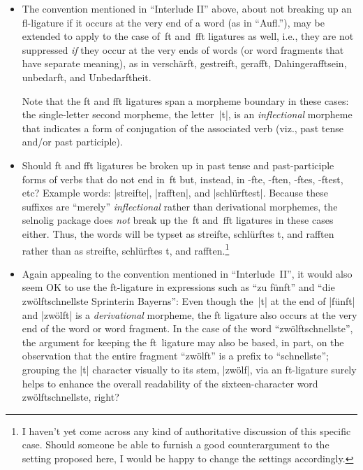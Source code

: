 \documentclass[11pt]{article}
\newcommand{\pkg}[1]{\textsf{#1}}
\begin{document}
\begin{itemize}
\begin{itemize}
\begin{itemize}
\item The convention mentioned in \enquote{Interlude II} above, about not breaking up an fl-ligature if it occurs at the very end of a word (as in ``Aufl.''), may be extended to apply to the case of~ft and~fft ligatures as well, i.e., they are not suppressed \emph{if} they occur at the very ends of words (or word fragments that have separate meaning), as in verschärft, gestreift, gerafft, Dahingerafftsein, unbedarft, and Unbedarftheit. 

Note that the ft and fft ligatures span a morpheme boundary in these cases: the single-letter second morpheme, the letter~|t|, is an \emph{inflectional} morpheme that indicates a form of conjugation of the associated verb (viz., past tense and/or past participle).

\item Should ft and fft ligatures be broken up in past tense and past-participle forms of verbs that do not end in~ft but, instead, in -fte, -ften, -ftes, -ftest, etc? Example words: |streifte|, |rafften|, and |schlürftest|. Because these suffixes are \enquote{merely} \emph{inflectional} rather than derivational morphemes, the \pkg{selnolig} package does \emph{not} break up the~ft and~fft ligatures in these cases either. Thus, the words will be typset as streifte, schlürftes\kern0pt t, and rafften rather than as streif\breaklig te, schlürf\breaklig tes\kern0pt t, and raff\breaklig ten.\footnote{I haven't yet come across any kind of authoritative discussion of this specific case. Should someone be able to furnish a good counterargument to the setting proposed here, I would be happy to change the settings accordingly.}

\enlargethispage{1.2\baselineskip}

\item Again appealing to the convention mentioned in \enquote{Interlude~II}, it would also seem OK to use the ft-ligature in expressions such as \enquote{zu fünft} and \enquote{die zwölftschnellste Sprinterin Bayerns}: Even though the~|t| at the end of |fünft| and |zwölft| is a \emph{derivational} morpheme, the ft ligature also occurs at the very end of the word or word fragment. In the case of the word \enquote{zwölftschnellste}, the argument for keeping the ft~ligature may also be based, in part, on the observation that the entire fragment \enquote{zwölft} is a prefix to \enquote{schnellste}; grouping the |t| character visually to its stem, |zwölf|, via an ft-ligature surely helps to enhance the overall readability of the sixteen-character word zwölftschnellste, right?


\end{itemize}
\end{itemize}
\end{itemize}
\end{document}
